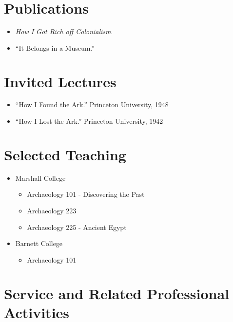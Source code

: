 \documentclass[margin,line]{res}
\def\tightlist{} %
\renewcommand{\subsection}[1]{\section{#1}}
\begin{document}
\begin{resume}
\hypertarget{publications}{%
\subsection{Publications}\label{publications}}

\begin{itemize}
\tightlist
\item
  \emph{How I Got Rich off Colonialism}.
\item
  ``It Belongs in a Museum.''
\end{itemize}

\hypertarget{invited-lectures}{%
\subsection{Invited Lectures}\label{invited-lectures}}

\begin{itemize}
\tightlist
\item
  ``How I Found the Ark.'' Princeton University, 1948
\item
  ``How I Lost the Ark.'' Princeton University, 1942
\end{itemize}

\hypertarget{selected-teaching}{%
\subsection{Selected Teaching}\label{selected-teaching}}

\begin{itemize}
\tightlist
\item
  Marshall College

  \begin{itemize}
  \tightlist
  \item
    Archaeology 101 - Discovering the Past
  \item
    Archaeology 223
  \item
    Archaeology 225 - Ancient Egypt
  \end{itemize}
\item
  Barnett College

  \begin{itemize}
  \tightlist
  \item
    Archaeology 101
  \end{itemize}
\end{itemize}

\hypertarget{service-and-related-professional-activities}{%
\subsection{Service and Related Professional
Activities}\label{service-and-related-professional-activities}}


\end{resume}
\end{document}

